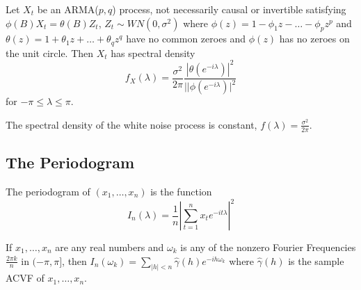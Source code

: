 \begin{thm}
  \label{sec:spectral-density-an-3}
  Let $X_{t}$ be an ARMA($p, q$) process, not necessarily causal or
  invertible satisfying $\phi(B)X_{t} = \theta(B) Z_{t}$, $Z_{t} \sim
  WN(0, \sigma^{2})$ where $\phi(z) = 1 - \phi_{1} z - \dots -
  \phi_{p} z^{p}$ and $\theta(z) = 1 + \theta_{1} z + \dots +
  \theta_{q} z^{q}$ have no common zeroes and $\phi(z)$ has no zeroes
  on the unit circle.  Then $X_{t}$ has spectral density
  \begin{equation}
    \label{eq:71}
    f_{X}(\lambda) = \frac{\sigma^{2}}{2 \pi} \frac{|\theta(e^{-i\lambda})|^{2}}{||\phi(e^{-i\lambda})|^{2}}
  \end{equation} for $-\pi \leq \lambda \leq \pi$.
\end{thm}

\begin{thm}
  \label{sec:spectral-density-an-4}
  The spectral density of the white noise process is constant,
  $f(\lambda) = \frac{\sigma^{2}}{2 \pi}$.
\end{thm}


\subsection{The Periodogram}
\label{sec:periodogram}

\begin{defn}
  \label{sec:periodogram-1}
  The periodogram of $(x_{1}, \dots, x_{n})$ is the function
  \begin{equation}
    \label{eq:74}
    I_{n}(\lambda) = \frac{1}{n} | \sum_{t=1}^{n} x_{t} e^{-it\lambda}|^{2}
  \end{equation}
\end{defn}

\begin{thm}
  \label{sec:periodogram-2}
  If $x_{1}, \dots, x_{n}$ are any real numbers and $\omega_{k}$ is
  any of the nonzero Fourier Frequencies $\frac{2 \pi k}{n}$ in
  $(-\pi, \pi]$, then $I_{n}(\omega_{k}) = \sum_{|h| < n}^{} \hat
  \gamma(h) e^{-ih \omega_{k}}$ where $\hat \gamma(h)$ is the sample
  ACVF of $x_{1}, \dots, x_{n}$.
\end{thm}


